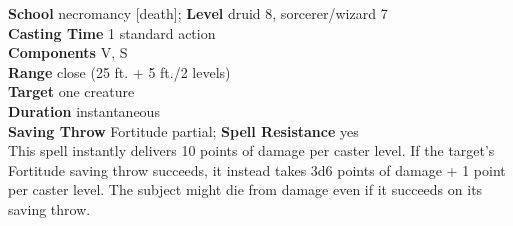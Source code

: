 \textbf{School} necromancy [death]; \textbf{Level} druid 8, sorcerer/wizard 7\\
\textbf{Casting Time} 1 standard action\\
\textbf{Components} V, S\\
\textbf{Range} close (25 ft. + 5 ft./2 levels)\\
\textbf{Target} one creature\\
\textbf{Duration} instantaneous\\
\textbf{Saving Throw} Fortitude partial; \textbf{Spell Resistance} yes\\
This spell instantly delivers 10 points of damage per caster level. If the target's Fortitude saving throw succeeds, it instead takes 3d6 points of damage + 1 point per caster level. The subject might die from damage even if it succeeds on its saving throw.\\
